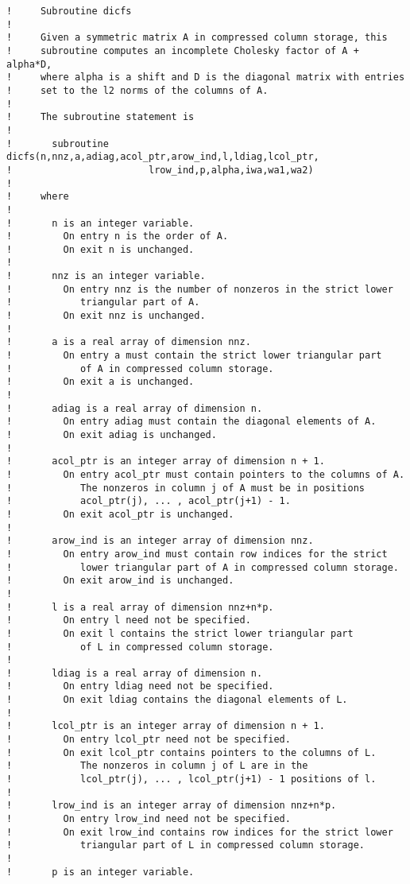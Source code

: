 \documentclass{galahad}
\begin{document}
\begin{verbatim}
!     Subroutine dicfs
!
!     Given a symmetric matrix A in compressed column storage, this
!     subroutine computes an incomplete Cholesky factor of A + alpha*D,
!     where alpha is a shift and D is the diagonal matrix with entries
!     set to the l2 norms of the columns of A.
!
!     The subroutine statement is
!
!       subroutine dicfs(n,nnz,a,adiag,acol_ptr,arow_ind,l,ldiag,lcol_ptr,
!                        lrow_ind,p,alpha,iwa,wa1,wa2)
!
!     where
!
!       n is an integer variable.
!         On entry n is the order of A.
!         On exit n is unchanged.
!
!       nnz is an integer variable.
!         On entry nnz is the number of nonzeros in the strict lower
!            triangular part of A.
!         On exit nnz is unchanged.
!
!       a is a real array of dimension nnz.
!         On entry a must contain the strict lower triangular part
!            of A in compressed column storage.
!         On exit a is unchanged.
!
!       adiag is a real array of dimension n.
!         On entry adiag must contain the diagonal elements of A.
!         On exit adiag is unchanged.
!
!       acol_ptr is an integer array of dimension n + 1.
!         On entry acol_ptr must contain pointers to the columns of A.
!            The nonzeros in column j of A must be in positions
!            acol_ptr(j), ... , acol_ptr(j+1) - 1.
!         On exit acol_ptr is unchanged.
!
!       arow_ind is an integer array of dimension nnz.
!         On entry arow_ind must contain row indices for the strict
!            lower triangular part of A in compressed column storage.
!         On exit arow_ind is unchanged.
!
!       l is a real array of dimension nnz+n*p.
!         On entry l need not be specified.
!         On exit l contains the strict lower triangular part
!            of L in compressed column storage.
!
!       ldiag is a real array of dimension n.
!         On entry ldiag need not be specified.
!         On exit ldiag contains the diagonal elements of L.
!
!       lcol_ptr is an integer array of dimension n + 1.
!         On entry lcol_ptr need not be specified.
!         On exit lcol_ptr contains pointers to the columns of L.
!            The nonzeros in column j of L are in the
!            lcol_ptr(j), ... , lcol_ptr(j+1) - 1 positions of l.
!
!       lrow_ind is an integer array of dimension nnz+n*p.
!         On entry lrow_ind need not be specified.
!         On exit lrow_ind contains row indices for the strict lower
!            triangular part of L in compressed column storage.
!
!       p is an integer variable.

\end{verbatim}
\end{document}
